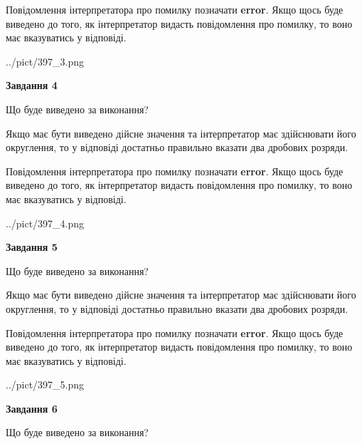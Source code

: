 \documentclass[12pt, ukrainian]{article}
\begin{document}
{\begin {Large}
Повідомлення інтерпретатора про помилку позначати \textbf{error}.
Якщо щось буде виведено до того, як інтерпретатор видасть повідомлення про помилку, 
то воно має вказуватись у відповіді. \par

\begin{center}
	{../pict/397_3.png}
\end{center}
\newpage

{\begin {center}\textbf{Завдання 4}\end {center}}\par
Що буде виведено за виконання? \par

Якщо має бути виведено дійсне значення та інтерпретатор має здійснювати його округлення, 
то у відповіді достатньо правильно вказати два дробових розряди.

Повідомлення інтерпретатора про помилку позначати \textbf{error}.
Якщо щось буде виведено до того, як інтерпретатор видасть повідомлення про помилку, 
то воно має вказуватись у відповіді. \par

\begin{center}
	{../pict/397_4.png}
\end{center}
\newpage

{\begin {center}\textbf{Завдання 5}\end {center}}\par
Що буде виведено за виконання? \par

Якщо має бути виведено дійсне значення та інтерпретатор має здійснювати його округлення, 
то у відповіді достатньо правильно вказати два дробових розряди.

Повідомлення інтерпретатора про помилку позначати \textbf{error}.
Якщо щось буде виведено до того, як інтерпретатор видасть повідомлення про помилку, 
то воно має вказуватись у відповіді. \par

\begin{center}
	{../pict/397_5.png}
\end{center}
\newpage

{\begin {center}\textbf{Завдання 6}\end {center}}\par
Що буде виведено за виконання? \par


\end{Large}}
\end{document}
